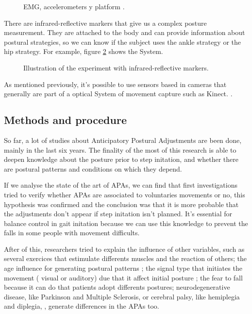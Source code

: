 \begin{figure}[H]
	\centering
	\caption{EMG, accelerometers y platform \cite{Gay2011}.}
	\label{fig:Captura}
\end{figure}

There are  infrared-reflective markers that give us a complex posture measurement. They are attached  to the body and can provide information about postural strategies, so we can know if the subject uses the ankle strategy or the hip strategy. For example, figure \ref{fig:Captura2} shows the System.

\begin{figure}[H]
	\centering
	\caption{Illustration of the experiment with infrared-reflective markers\cite{Teddy2013}.}
	\label{fig:Captura2}
\end{figure}

As mentioned previously, it's possible to use sensors based in cameras that generally are part of a optical System of movement capture such  as Kinect. \cite{Instr5}.


\subsection{Methods and procedure}

So far, a lot of studies about Anticipatory Postural Adjustments are been done, mainly in the  last six years. The finality of the most of this research is able to deepen knowledge about the posture prior to step initation, and whether there are postural patterns and conditions on which they depend.

If we analyse the state of the art of APAs, we can find that first investigations tried to verify whether APAs are associated to voluntaries movements or no,  this hypothesis was confirmed and the conclusion was that it is more probable that the adjustments don’t appear if step initation isn’t planned. It’s essential for balance control in gait initation because we can use this knowledge to prevent the falls in some people with movement difficults\cite{Mcllroy1993}\cite{Yiou2012}\cite{Teddy2013}\cite{Bouisset2008}\cite{Neeta2014}.

After of this, researchers tried to explain the influence of other variables, such as several exercices that estimulate differents muscles and the reaction of others\cite{Gay2011}; the age influence for generating postural patterns \cite{Bleuse2006} \cite{Estelle2008}; the signal type that initiates the movement ( visual or auditory) due that it affect initial posture \cite{Mcllroy1993}\cite{Antonia2009}\cite{Vicent1999}\cite{Tard2013}; the fear to fall because it can do that patients adopt differents postures\cite{Chris2005}; neurodegenerative disease, like Parkinson and Multiple Sclerosis\cite{Mancini2009}\cite{Jebb2008}\cite{Chris2005}\cite{Hall2013}, or cerebral palsy, like hemiplegia and diplegia, \cite{Hall2013}, generate differences in the APAs too.

